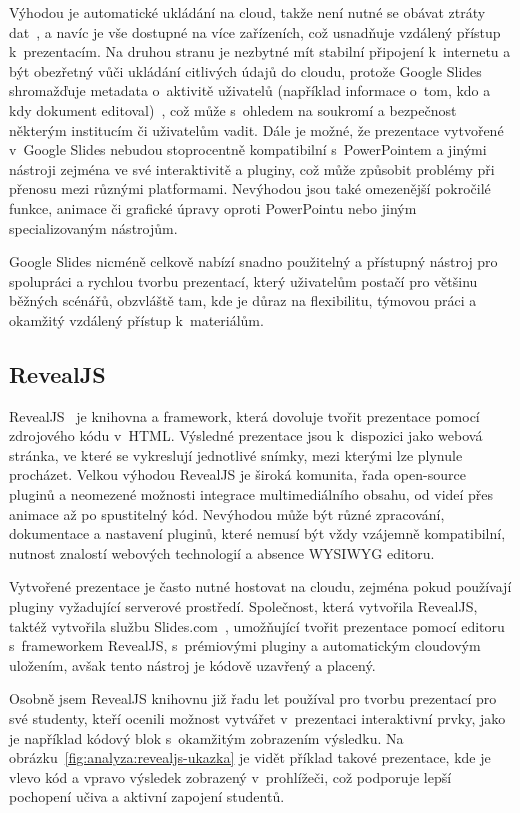 Výhodou je automatické ukládání na cloud, takže není nutné se obávat ztráty dat~\cite{slides}, a navíc je vše dostupné na více zařízeních, což usnadňuje vzdálený přístup k~prezentacím. 
Na druhou stranu je nezbytné mít stabilní připojení k~internetu a být obezřetný vůči ukládání citlivých údajů do cloudu, protože Google Slides shromažďuje metadata o~aktivitě uživatelů (například informace o~tom, kdo a kdy dokument editoval)~\cite{google_terms}, což může s~ohledem na soukromí a bezpečnost některým institucím či uživatelům vadit. 
Dále je možné, že prezentace vytvořené v~Google Slides nebudou stoprocentně kompatibilní s~PowerPointem a jinými nástroji zejména ve své interaktivitě a pluginy, což může způsobit problémy při přenosu mezi různými platformami. 
Nevýhodou jsou také omezenější pokročilé funkce, animace či grafické úpravy oproti PowerPointu nebo jiným specializovaným nástrojům. 

Google Slides nicméně celkově nabízí snadno použitelný a přístupný nástroj pro spolupráci a rychlou tvorbu prezentací, který uživatelům postačí pro většinu běžných scénářů, obzvláště tam, kde je důraz na flexibilitu, týmovou práci a okamžitý vzdálený přístup k~materiálům.


\subsection{RevealJS}\label{text:revealjs}

RevealJS~\cite{revealjs} je knihovna a framework, která dovoluje tvořit prezentace pomocí zdrojového kódu v~HTML. 
Výsledné prezentace jsou k~dispozici jako webová stránka, ve které se vykreslují jednotlivé snímky, mezi kterými lze plynule procházet. 
Velkou výhodou RevealJS je široká komunita, řada open-source pluginů a neomezené možnosti integrace multimediálního obsahu, od videí přes animace až po spustitelný kód. 
Nevýhodou může být různé zpracování, dokumentace a nastavení pluginů, které nemusí být vždy vzájemně kompatibilní, nutnost znalostí webových technologií a absence WYSIWYG editoru. 

Vytvořené prezentace je často nutné hostovat na cloudu, zejména pokud používají pluginy vyžadující serverové prostředí.
Společnost, která vytvořila RevealJS, taktéž vytvořila službu Slides.com~\cite{revealjs, slidescom}, umožňující tvořit prezentace pomocí editoru s~frameworkem RevealJS, s~prémiovými pluginy a automatickým cloudovým uložením, avšak tento nástroj je kódově uzavřený a placený. 

Osobně jsem RevealJS knihovnu již řadu let používal pro tvorbu prezentací pro své studenty, kteří ocenili možnost vytvářet v~prezentaci interaktivní prvky, jako je například kódový blok s~okamžitým zobrazením výsledku. 
Na obrázku~\ref{fig:analyza:revealjs-ukazka} je vidět příklad takové prezentace, kde je vlevo kód a vpravo výsledek zobrazený v~prohlížeči, což podporuje lepší pochopení učiva a aktivní zapojení studentů. 

